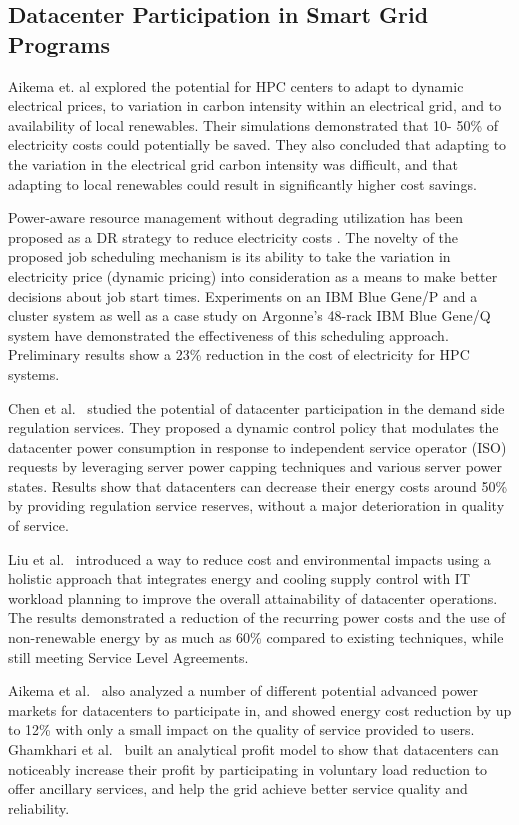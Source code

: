 \subsection{Datacenter Participation in Smart Grid \\Programs}
Aikema et. al \cite{aikema_electrical_2011} explored the potential for HPC
centers to adapt to dynamic electrical prices, to variation in carbon intensity
within an electrical grid, and to availability of local renewables. Their
simulations demonstrated that 10- 50\% of electricity costs could potentially
be saved. They also concluded that adapting to the variation in the electrical
grid carbon intensity was difficult, and that adapting to local renewables could
result in significantly higher cost savings.

Power-aware resource management without degrading utilization has been proposed
as a DR strategy to reduce electricity costs
\cite{yang_integrating_2013,zhou_reducing_2013}. The novelty of the proposed job
scheduling mechanism is its ability to take the variation in electricity price
(dynamic pricing) into consideration as a means to make better decisions about
job start times. Experiments on an IBM Blue Gene/P and a cluster system as well
as a case study on Argonne's 48-rack IBM Blue Gene/Q system have demonstrated
the effectiveness of this scheduling approach. Preliminary results show a 23\%
reduction in the cost of electricity for HPC systems.

Chen et al.~\cite{chen2014aspdac} studied the potential of datacenter participation in the demand side regulation services. They proposed a dynamic control policy that modulates the datacenter power consumption in response to independent service operator (ISO) requests by leveraging server power capping techniques and various server power states. Results show that datacenters can decrease their energy costs around 50\% by providing regulation service reserves, without a major deterioration in quality of service.

Liu et al.~\cite{liu2012renewable} introduced a way to reduce cost and environmental impacts using a holistic approach that integrates energy and cooling supply control with IT workload planning to improve the overall attainability of datacenter operations. The results demonstrated a reduction of the recurring power costs and the use of non-renewable energy by as much as 60\% compared to existing techniques, while still meeting Service Level Agreements.

Aikema et al.~\cite{aikema2012data} also analyzed a number of different potential advanced power markets for datacenters to participate in, and showed energy cost reduction by up to 12\% with only a small impact on the quality of service provided to users. Ghamkhari et al.~\cite{ghamkhari2012data} built an analytical profit model to show that datacenters can noticeably increase their profit by participating in voluntary load reduction to offer ancillary services, and help the grid achieve better service quality and reliability. 
